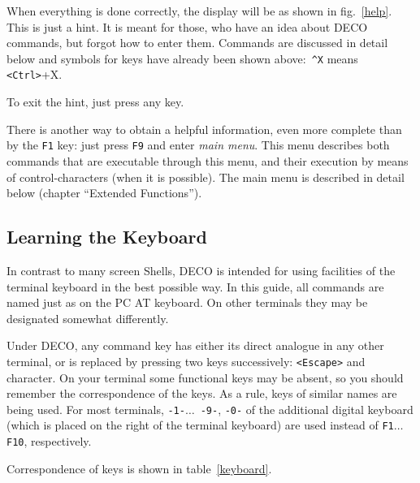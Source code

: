 
When everything is done correctly, the display will be 
as shown in fig.~\ref{help}.
This is just a hint. It is meant for those, who have an 
idea about DECO commands, but forgot how to enter 
them. Commands are discussed in detail below and 
symbols for keys have already been shown above:~{\tt \^{}X}
means {\tt <Ctrl>}+X.

To exit the hint, just press any key. 

There is another way to obtain a helpful information, even more
complete than by the {\tt F1} key: just press {\tt F9} and enter
{\em main menu}. This menu describes both commands that
are executable through this menu, and their execution 
by means of control-characters (when it is possible). The
main menu is described in detail below (chapter ``Extended Functions'').

\subsection{Learning the Keyboard}

In contrast to many screen Shells, DECO is intended for 
using facilities of the terminal keyboard in the best 
possible way. In this guide, all commands are named just as on
the PC AT keyboard. On other terminals they may be designated
somewhat differently.

Under DECO, any command key has either its direct
analogue in any other terminal, or is replaced by 
pressing two keys successively: {\tt <Escape>} and character.
On your terminal some functional keys may be absent,
so you should remember the correspondence of the keys.
As a rule, keys of similar names are being used. For most terminals,
{\tt -1-}$\ldots$~{\tt -9-}, {\tt -0-} of the additional digital keyboard
(which is placed on the right of the terminal keyboard) are used
instead of {\tt F1}$\ldots${\tt F10}, respectively.

Correspondence of keys is shown in table~\ref{keyboard}.

